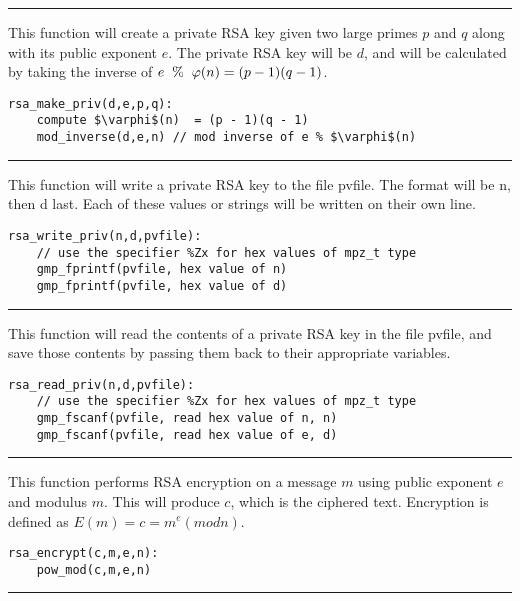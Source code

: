 \documentclass[
	12pt, %
]{fphw}
\begin{document}
\noindent\rule{6.3in}{0.4pt}

This function will create a private RSA key given two large primes $p$ and $q$ along with its public exponent $e$. The private RSA key will be $d$, and will be calculated by taking the inverse of $e\hspace{2mm}\%\hspace{2mm}\varphi(n) = (p - 1)(q - 1)$.
\begin{lstlisting}[mathescape=true]
rsa_make_priv(d,e,p,q):
	compute $\varphi$(n)  = (p - 1)(q - 1)
	mod_inverse(d,e,n) // mod inverse of e % $\varphi$(n)
\end{lstlisting}

\noindent\rule{6.3in}{0.4pt}

This function will write a private RSA key to the file pvfile. The format will be n, then d last. Each of these values or strings will be written on their own line.
\begin{lstlisting}[mathescape=true]
rsa_write_priv(n,d,pvfile):
	// use the specifier %Zx for hex values of mpz_t type
	gmp_fprintf(pvfile, hex value of n)
	gmp_fprintf(pvfile, hex value of d)
\end{lstlisting}

\noindent\rule{6.3in}{0.4pt}

This function will read the contents of a private RSA key in the file pvfile, and save those contents by passing them back to their appropriate variables.
\begin{lstlisting}[mathescape=true]
rsa_read_priv(n,d,pvfile):
	// use the specifier %Zx for hex values of mpz_t type
	gmp_fscanf(pvfile, read hex value of n, n)
	gmp_fscanf(pvfile, read hex value of e, d)
\end{lstlisting}

\noindent\rule{6.3in}{0.4pt}

This function performs RSA encryption on a message $m$ using public exponent $e$ and modulus $m$. This will produce $c$, which is the ciphered text. Encryption is defined as $E(m) = c = m^e (mod n)$.
\begin{lstlisting}[mathescape=true]
rsa_encrypt(c,m,e,n):
	pow_mod(c,m,e,n)
\end{lstlisting}

\noindent\rule{6.3in}{0.4pt}
\end{document}
